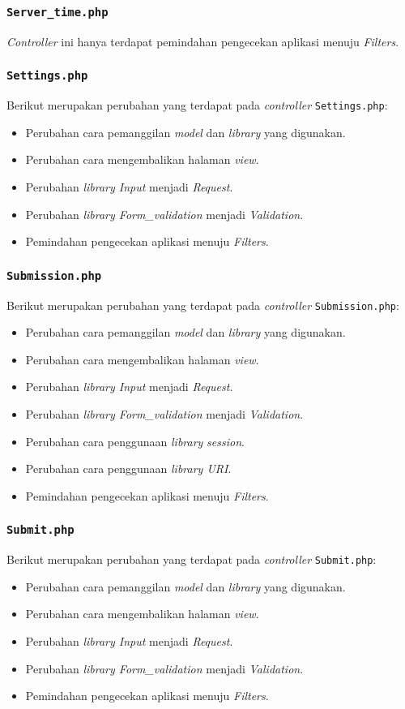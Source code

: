\subsubsection{\texttt{Server\_time.php}}
\textit{Controller} ini hanya terdapat pemindahan pengecekan aplikasi menuju \textit{Filters}.
\subsubsection{\texttt{Settings.php}}
Berikut merupakan perubahan yang terdapat pada \textit{controller} \texttt{Settings.php}:
\begin{itemize}
 	\item Perubahan cara pemanggilan \textit{model} dan \textit{library} yang digunakan.
	\item Perubahan cara mengembalikan halaman \textit{view}.
	\item Perubahan \textit{library Input} menjadi \textit{Request}.
	\item Perubahan \textit{library Form\_validation} menjadi \textit{Validation}.
	\item Pemindahan pengecekan aplikasi menuju \textit{Filters}.
\end{itemize}
\subsubsection{\texttt{Submission.php}}
Berikut merupakan perubahan yang terdapat pada \textit{controller} \texttt{Submission.php}:
\begin{itemize}
	\item Perubahan cara pemanggilan \textit{model} dan \textit{library} yang digunakan.
	\item Perubahan cara mengembalikan halaman \textit{view}.
	\item Perubahan \textit{library Input} menjadi \textit{Request}.
	\item Perubahan \textit{library Form\_validation} menjadi \textit{Validation}.
	\item Perubahan cara penggunaan \textit{library} \textit{session}.
	\item Perubahan cara penggunaan \textit{library URI}.
	\item Pemindahan pengecekan aplikasi menuju \textit{Filters}.
\end{itemize}
\subsubsection{\texttt{Submit.php}}
Berikut merupakan perubahan yang terdapat pada \textit{controller} \texttt{Submit.php}:
\begin{itemize}
	\item Perubahan cara pemanggilan \textit{model} dan \textit{library} yang digunakan.
	\item Perubahan cara mengembalikan halaman \textit{view}.
	\item Perubahan \textit{library Input} menjadi \textit{Request}.
	\item Perubahan \textit{library Form\_validation} menjadi \textit{Validation}.
	\item Pemindahan pengecekan aplikasi menuju \textit{Filters}.
\end{itemize}

